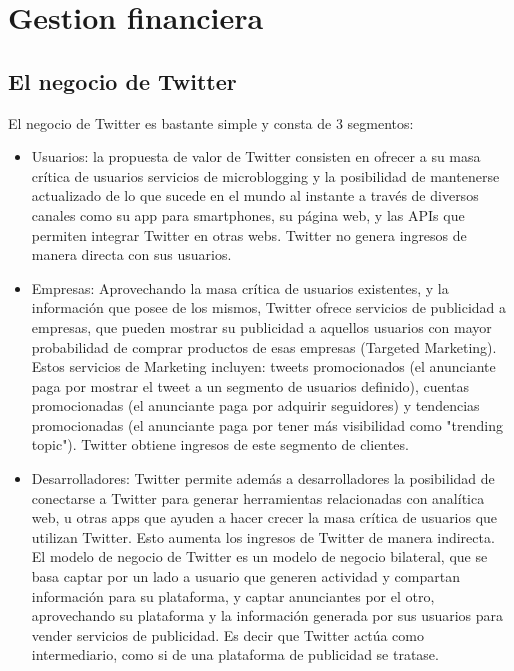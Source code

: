 \section{Gestion financiera}

\subsection{El negocio de Twitter}

El negocio de Twitter es bastante simple y consta de 3 segmentos:

\begin{itemize}


\item Usuarios: la propuesta de valor de Twitter consisten en ofrecer a su masa crítica de usuarios servicios de microblogging y la posibilidad de mantenerse actualizado de lo que sucede en el mundo  al  instante  a  través  de  diversos  canales  como  su  app  para  smartphones,  su  página web, y las APIs que permiten integrar Twitter en otras webs. Twitter no genera ingresos de manera directa con sus usuarios.

\item Empresas: Aprovechando la masa crítica de usuarios existentes, y la información que posee de  los  mismos,  Twitter  ofrece  servicios  de  publicidad  a  empresas,  que  pueden  mostrar  su publicidad a aquellos usuarios con mayor probabilidad  de  comprar  productos  de  esas empresas (Targeted  Marketing). Estos servicios de Marketing incluyen: tweets promocionados (el anunciante paga por mostrar el tweet a un segmento de usuarios definido), cuentas promocionadas (el anunciante paga por adquirir seguidores) y tendencias promocionadas (el anunciante paga por tener más visibilidad como "trending topic"). Twitter obtiene ingresos de este segmento de clientes.

\item Desarrolladores: Twitter permite además a desarrolladores la posibilidad de conectarse a 
Twitter para generar herramientas relacionadas con analítica web, u otras apps que ayuden a 
hacer crecer la masa crítica de usuarios que utilizan Twitter. Esto aumenta los ingresos de Twitter de manera indirecta. El modelo de negocio de Twitter es un modelo de negocio bilateral, que se basa captar por un lado a usuario que generen actividad y compartan información para su plataforma, y  captar anunciantes por el otro, aprovechando su plataforma y la información generada por sus usuarios para vender servicios de publicidad. Es decir que Twitter actúa como intermediario, como si de una plataforma  de  publicidad  se  tratase.


\end{itemize}

